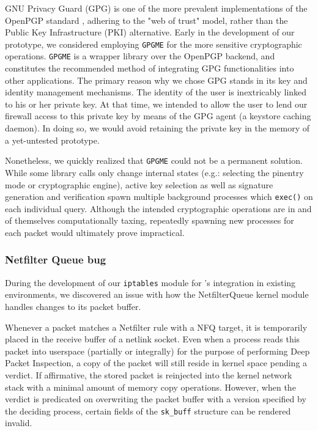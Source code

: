 GNU Privacy Guard (GPG) is one of the more prevalent implementations of the OpenPGP standard \cite{rfc4880}, adhering to the "web of trust" model, rather than the Public Key Infrastructure (PKI) \cite{maurer1996modelling} alternative. Early in the development of our prototype, we considered employing \texttt{GPGME} for the more sensitive cryptographic operations. \texttt{GPGME} is a wrapper library over the OpenPGP backend, and constitutes the recommended method of integrating GPG functionalities into other applications. The primary reason why we chose GPG stands in its key and identity management mechanisms. The identity of the user is inextricably linked to his or her private key. At that time, we intended to allow the user to lend our firewall access to this private key by means of the GPG agent (a keystore caching daemon). In doing so, we would avoid retaining the private key in the memory of a yet-untested prototype.

Nonetheless, we quickly realized that \texttt{GPGME} could not be a permanent solution. While some library calls only change internal states (e.g.: selecting the pinentry mode or cryptographic engine), active key selection as well as signature generation and verification spawn multiple background processes which \texttt{exec()} on each individual query. Although the intended cryptographic operations are in and of themselves computationally taxing, repeatedly spawning new processes for each packet would ultimately prove impractical.


\subsubsection{Netfilter Queue bug}
\label{sign:linux:discussion:bug}

During the development of our \texttt{iptables} module for \daf{}'s integration in existing environments, we discovered an issue with how the NetfilterQueue kernel module handles changes to its packet buffer.

Whenever a packet matches a Netfilter rule with a NFQ target, it is temporarily placed in the receive buffer of a netlink socket. Even when a process reads this packet into userspace (partially or integrally) for the purpose of performing Deep Packet Inspection, a copy of the packet will still reside in kernel space pending a verdict. If affirmative, the stored packet is reinjected into the kernel network stack with a minimal amount of memory copy operations. However, when the verdict is predicated on overwriting the packet buffer with a version specified by the deciding process, certain fields of the \texttt{sk\_buff} structure can be rendered invalid.

